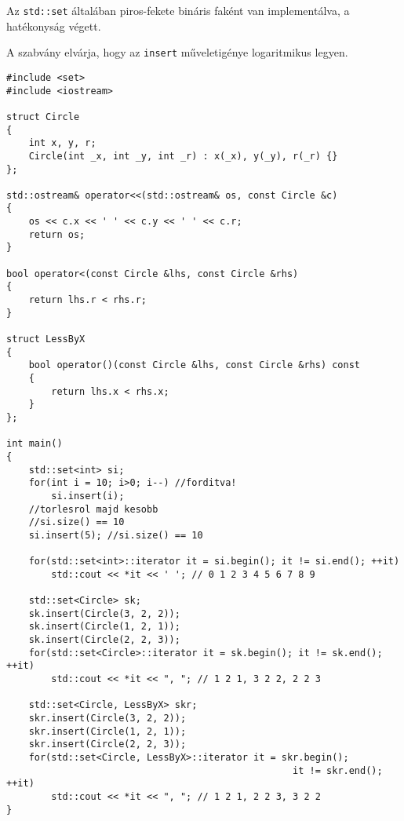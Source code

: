 \documentclass[a4paper,11.5pt,table]{article}
\begin{document}
	Az \texttt{std::set} általában piros-fekete bináris faként van implementálva, a hatékonyság végett.
	\begin{note}
		A szabvány elvárja, hogy az \texttt{insert} műveletigénye logaritmikus legyen.
	\end{note}
	\begin{lstlisting}
#include <set>
#include <iostream>

struct Circle
{
	int x, y, r;
	Circle(int _x, int _y, int _r) : x(_x), y(_y), r(_r) {}
};

std::ostream& operator<<(std::ostream& os, const Circle &c)
{
	os << c.x << ' ' << c.y << ' ' << c.r;
	return os;
}

bool operator<(const Circle &lhs, const Circle &rhs)
{
	return lhs.r < rhs.r;
}

struct LessByX
{
	bool operator()(const Circle &lhs, const Circle &rhs) const
	{
		return lhs.x < rhs.x;
	}
};

int main()
{
	std::set<int> si;
	for(int i = 10; i>0; i--) //forditva!
		si.insert(i);
	//torlesrol majd kesobb
	//si.size() == 10
	si.insert(5); //si.size() == 10
	
	for(std::set<int>::iterator it = si.begin(); it != si.end(); ++it)
		std::cout << *it << ' '; // 0 1 2 3 4 5 6 7 8 9
	
	std::set<Circle> sk;
	sk.insert(Circle(3, 2, 2));
	sk.insert(Circle(1, 2, 1));
	sk.insert(Circle(2, 2, 3));
	for(std::set<Circle>::iterator it = sk.begin(); it != sk.end(); ++it)
		std::cout << *it << ", "; // 1 2 1, 3 2 2, 2 2 3
	
	std::set<Circle, LessByX> skr;
	skr.insert(Circle(3, 2, 2));
	skr.insert(Circle(1, 2, 1));
	skr.insert(Circle(2, 2, 3));
	for(std::set<Circle, LessByX>::iterator it = skr.begin(); 
												   it != skr.end(); ++it)
		std::cout << *it << ", "; // 1 2 1, 2 2 3, 3 2 2
}	
	\end{lstlisting}
\end{document}
